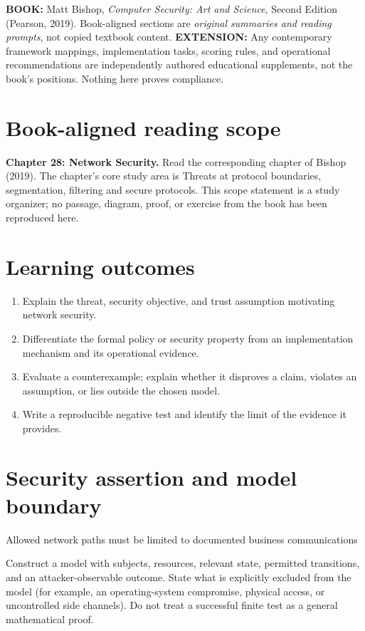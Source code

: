 \documentclass[10pt,letterpaper]{article}
\begin{document}
\makedoctocpage
\begin{notebox}
\textbf{BOOK:} Matt Bishop, \emph{Computer Security: Art and Science}, Second Edition (Pearson, 2019). Book-aligned sections are \emph{original summaries and reading prompts}, not copied textbook content.
\textbf{EXTENSION:} Any contemporary framework mappings, implementation tasks, scoring rules, and operational recommendations are independently authored educational supplements, not the book's positions. Nothing here proves compliance.
\end{notebox}
\section{Book-aligned reading scope}
\textbf{Chapter 28: Network Security.} Read the corresponding chapter of Bishop (2019). The chapter's core study area is Threats at protocol boundaries, segmentation, filtering and secure protocols. This scope statement is a study organizer; no passage, diagram, proof, or exercise from the book has been reproduced here.
\section{Learning outcomes}
\begin{enumerate}
\item Explain the threat, security objective, and trust assumption motivating network security.
\item Differentiate the formal policy or security property from an implementation mechanism and its operational evidence.
\item Evaluate a counterexample; explain whether it disproves a claim, violates an assumption, or lies outside the chosen model.
\item Write a reproducible negative test and identify the limit of the evidence it provides.
\end{enumerate}
\section{Security assertion and model boundary}
\begin{infobox}
Allowed network paths must be limited to documented business communications
\end{infobox}
Construct a model with subjects, resources, relevant state, permitted transitions, and an attacker-observable outcome. State what is explicitly excluded from the model (for example, an operating-system compromise, physical access, or uncontrolled side channels). Do not treat a successful finite test as a general mathematical proof.
\end{document}
